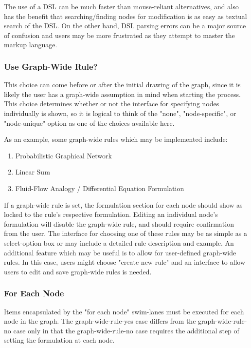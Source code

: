 \documentclass[conference]{IEEEtran}
\begin{document}
The use of a DSL can be much faster than mouse-reliant alternatives, and also has the benefit that searching/finding nodes for modification is as easy as textual search of the DSL.
On the other hand, DSL parsing errors can be a major source of confusion and users may be more frustrated as they attempt to master the markup language.


\subsubsection{Use Graph-Wide Rule?}
This choice can come before or after the initial drawing of the graph, since it is likely the user has a graph-wide assumption in mind when starting the process. 
This choice determines whether or not the interface for specifying nodes individually is shown, so it is logical to think of the "none", "node-specific", or "node-unique" option as one of the choices available here. 

As an example, some graph-wide rules which may be implemented include:
\begin{enumerate}
  \item Probabilistic Graphical Network
  \item Linear Sum
  \item Fluid-Flow Analogy / Differential Equation Formulation
\end{enumerate}

If a graph-wide rule is set, the formulation section for each node should show as locked to the rule's respective formulation. 
Editing an individual node's formulation will disable the graph-wide rule, and should require confirmation from the user. 
The interface for choosing one of these rules may be as simple as a select-option box or may include a detailed rule description and example. 
An additional feature which may be useful is to allow for user-defined graph-wide rules. 
In this case, users might choose "create new rule" and an interface to allow users to edit and save graph-wide rules is needed.

\subsubsection{For Each Node}

Items encapsulated by the "for each node" swim-lanes must be executed for each node in the graph. 
The graph-wide-rule-yes case differs from the graph-wide-rule-no case only in that the graph-wide-rule-no case requires the additional step of setting the formulation at each node.
\end{document}
